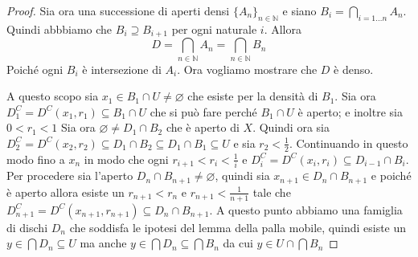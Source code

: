 \documentclass{article}
\theoremstyle{plain}
\theoremstyle{definition}
\theoremstyle{remark}
\begin{document}
\begin{proof}
Sia ora una successione di aperti densi \(\{A_n\}_{n \in \mathbb{N}} \) e siano
\(B_{i} = \bigcap_{i = 1\dots n} A_n\). Quindi abbbiamo che \(B_i \supseteq B_{i
+ 1} \) per ogni naturale \(i\). Allora
\[
    D = \bigcap_{n \in \mathbb{N}} A_n = \bigcap_{n \in \mathbb{N}} B_n
\]
Poiché ogni \(B_i\) è intersezione di \(A_i\). Ora vogliamo mostrare che \(D\) è denso.

A questo scopo sia \(x_{1} \in B_{1} \cap U \neq \varnothing\) che esiste per la
densità di \(B_{1}\). Sia ora \(D_{1}^{C} = D^{C}(x_{1}, r_{1}) \subseteq B_{1}
\cap U\) che si può fare perché \(B_{1} \cap U\) è aperto; e inoltre sia \(0 <
r_{1} < 1\) 
Sia ora \(\varnothing \neq D_{1} \cap B_{2}\) che è aperto di \(X\). Quindi ora
sia \(D_{2}^{C} = D^{C}(x_{2}, r_{2}) \subseteq D_{1} \cap B_{2} \subseteq D_{1}
\cap B_{1} \subseteq U \) e sia \(r_{2} < \frac{1}{2}\). Continuando in questo
modo fino a \(x_{n}\) in modo che ogni \(r_{i+1} < r_{i} < \frac{1}{i}\) e
\(D^{C}_i = D^{C}(x_{i}, r_{i}) \subseteq D_{i - 1} \cap B_{i} \). Per procedere
sia l'aperto \(D_n \cap B_{n+1} \neq \varnothing\), quindi sia \(x_{n+1} \in D_n \cap
B_{n+1}\) e poiché è aperto allora esiste un \(r_{n+1} < r_n\) e \(r_{n+1} <
\frac{1}{n+1}\) tale che \(D_{n+1}^{C} = D^{C}(x_{n+1}, r_{n+1}) \subseteq D_n
\cap B_{n+1} \).
A questo punto abbiamo una famiglia di dischi \(D_n\) che soddisfa le ipotesi
del lemma della palla mobile, quindi esiste un \(y \in \bigcap D_n \subseteq U
\) ma anche \(y \in \bigcap D_n \subseteq \bigcap B_n \) da cui \(y \in U \cap \bigcap B_n\) 
\end{proof}
\end{document}
